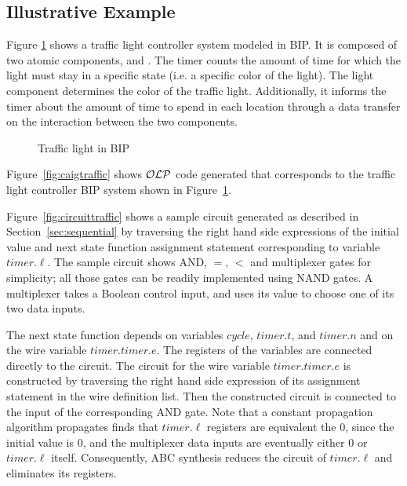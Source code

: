 \subsection{Illustrative Example}
Figure \ref{fig:traffic:bip} shows a traffic light controller system modeled in BIP. 
It is composed of two atomic components,  and . The timer counts
the amount of time for which the light must stay in a specific state (i.e. a specific
color of the light). The light component determines the color of the traffic light. Additionally, it
informs the timer about the amount of time to spend in each location through a data transfer on the interaction between the two components. 

\begin{figure}[h!]
 \centering
 \resizebox{0.5\textwidth}{!}{
   
 }
 \caption{Traffic light in BIP}
 \label{fig:traffic:bip}
\end{figure}

Figure~\ref{fig:caigtraffic} shows $\mathcal{OLP}$ code generated that corresponds to the traffic light controller BIP system shown in Figure~\ref{fig:traffic:bip}. 



Figure~\ref{fig:circuittraffic} shows a sample circuit generated as described in 
Section~\ref{sec:sequential}
by traversing the right hand side expressions of the initial 
value and next state function assignment statement corresponding to variable
$timer.\ell$. 
The sample circuit shows AND, $=$, $<$ and multiplexer gates for simplicity; 
all those gates can be readily implemented using NAND gates. 
A multiplexer takes a Boolean control input, and uses its value to 
choose one of its two data inputs. 

The next state function depends on variables $cycle$, $timer.t$, and $timer.n$ and on 
the wire variable $timer.timer.e$. 
The registers of the variables are connected directly to the circuit. 
The circuit for the wire variable $timer.timer.e$ is constructed by traversing 
the right hand side expression of its 
assignment statement in the wire definition list. 
Then the constructed circuit is connected to the input of the corresponding AND gate. 
Note that a constant propagation algorithm propagates finds that 
$timer.\ell$ registers are equivalent the $0$, since the initial value is $0$, 
and the multiplexer data inputs are eventually either $0$ or $timer.\ell$ itself. 
Consequently, ABC synthesis reduces the circuit of $timer.\ell$ and eliminates its
registers. 



